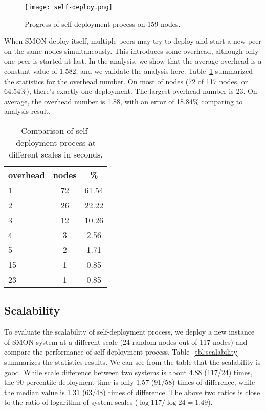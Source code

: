 \begin{figure}%
\centering
\texttt{[image: self-deploy.png]}
\caption{Progress of self-deployment process on 159
nodes.}
\label{fig:smonperf}
\end{figure}

When SMON deploy itself, multiple peers may try to deploy
and start a new peer on the same nodes simultaneously. This
introduces some overhead, although only one peer is started
at last. In the analysis, we show that the average overhead
is a constant value of 1.582, and we validate the analysis
here. Table~\ref{tbl:overhead} summarized the statistics for
the overhead number. On most of nodes (72 of 117 nodes, or
64.54\%), there's exactly one deployment. The largest
overhead number is 23. On average, the overhead number is
1.88, with an error of 18.84\% comparing to analysis result.

\begin{table}
\centering
\begin{tabular}{|l|c|c|}
\hline
overhead & nodes & \% \\
\hline
1 & 72 & 61.54 \\
2 & 26 & 22.22 \\
3 & 12 & 10.26 \\
4 & 3 & 2.56 \\
5 & 2 & 1.71 \\
15 & 1 & 0.85 \\
23 & 1 & 0.85 \\
\hline
\end{tabular}
\caption{Comparison of self-deployment process at different
scales in seconds.}
\label{tbl:overhead}
\end{table}

\subsection{Scalability}

To evaluate the scalability of self-deployment process, we
deploy a new instance of SMON system at a different scale
(24 random nodes out of 117 nodes) and compare the
performance of self-deployment process.
Table~\ref{tbl:scalability} summarizes the statistics
results.  We can see from the table that the scalability is
good.  While scale difference between two systems is about
4.88 (117/24) times, the 90-percentile deployment time is
only 1.57 (91/58) times of difference, while the median
value is 1.31 (63/48) times of difference.  The above two
ratios is close to the ratio of logarithm of system scales
($\log 117 / \log 24 = 1.49$).

